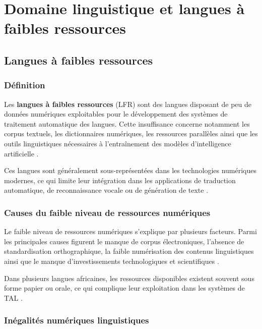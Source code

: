 \section{Domaine linguistique et langues à faibles ressources}

\subsection{Langues à faibles ressources}

\subsubsection{Définition}

Les \textbf{langues à faibles ressources} (\ac{LFR}) sont des langues disposant de peu de données numériques exploitables pour le développement des systèmes de traitement automatique des langues. Cette insuffisance concerne notamment les corpus textuels, les dictionnaires numériques, les ressources parallèles ainsi que les outils linguistiques nécessaires à l'entraînement des modèles d'intelligence artificielle \cite{ranathunga2023neural, agyei2024low}.

Ces langues sont généralement sous-représentées dans les technologies numériques modernes, ce qui limite leur intégration dans les applications de traduction automatique, de reconnaissance vocale ou de génération de texte \cite{ranathunga2023neural, haulai2023construction}.

\subsubsection{Causes du faible niveau de ressources numériques}

Le faible niveau de ressources numériques s'explique par plusieurs facteurs. Parmi les principales causes figurent le manque de corpus électroniques, l'absence de standardisation orthographique, la faible numérisation des contenus linguistiques ainsi que le manque d'investissements technologiques et scientifiques \cite{agyei2024low, jindal2017building}.

Dans plusieurs langues africaines, les ressources disponibles existent souvent sous forme papier ou orale, ce qui complique leur exploitation dans les systèmes de \ac{TAL} \cite{agyei2024low, mandiya2026lingala}.

\subsubsection{Inégalités numériques linguistiques}

